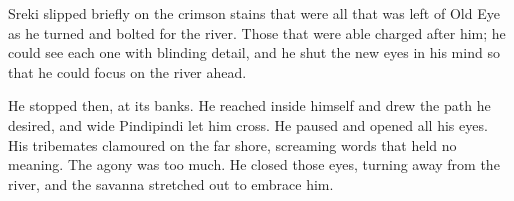 Sreki slipped briefly on the crimson stains that were all that was left of Old Eye as he turned and bolted for the river. Those that were able charged after him; he could see each one with blinding detail, and he shut the new eyes in his mind so that he could focus on the river ahead.

He stopped then, at its banks. He reached inside himself and drew the path he desired, and wide Pindipindi let him cross. He paused and opened all his eyes. His tribemates clamoured on the far shore, screaming words that held no meaning. The agony was too much. He closed those eyes, turning away from the river, and the savanna stretched out to embrace him.

